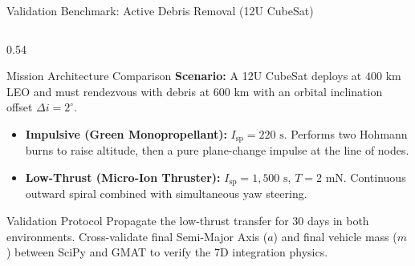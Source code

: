 \documentclass[aspectratio=169, 10pt]{beamer}
\begin{document}
\begin{frame}{Validation Benchmark: Active Debris Removal (12U CubeSat)}
    \begin{columns}[T]
        \begin{column}{0.54\textwidth}
            \begin{block}{Mission Architecture Comparison}
                \scriptsize
                \textbf{Scenario:} A 12U CubeSat deploys at $400\text{ km}$ LEO and must rendezvous with debris at $600\text{ km}$ with an orbital inclination offset $\Delta i = 2^\circ$.
                \vspace{0.1cm}
                \begin{itemize}\setlength{\itemsep}{2pt}
                    \item \textbf{Impulsive (Green Monopropellant):} $I_{\text{sp}} = 220\text{ s}$. Performs two Hohmann burns to raise altitude, then a pure plane-change impulse at the line of nodes.
                    \item \textbf{Low-Thrust (Micro-Ion Thruster):} $I_{\text{sp}} = 1{,}500\text{ s}$, $T = 2\text{ mN}$. Continuous outward spiral combined with simultaneous yaw steering.
                \end{itemize}
            \end{block}
            \vspace{-0.1cm}
            \begin{exampleblock}{Validation Protocol}
                \scriptsize
                Propagate the low-thrust transfer for 30 days in both environments. Cross-validate final Semi-Major Axis ($a$) and final vehicle mass ($m$) between SciPy and GMAT to verify the 7D integration physics.
            \end{exampleblock}
        \end{column}


\end{columns}
\end{frame}
\end{document}
